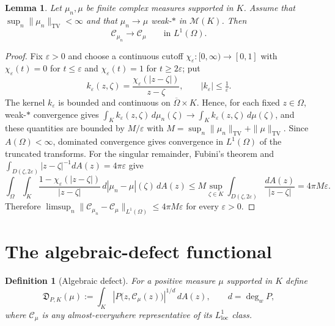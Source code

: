 \documentclass[10pt,a4paper]{amsart}
\newtheorem{lemma}[theorem]{Lemma}
\newtheorem{definition}[theorem]{Definition}
\newcommand{\M}{\mathcal M}
\newcommand{\Cauchy}{\mathcal C}
\newcommand{\TV}{\mathrm{TV}}
\newcommand{\eps}{\varepsilon}
\begin{document}
\begin{lemma}\label{lem:L1-Cauchy-continuity}
Let $\mu_n,\mu$ be finite complex measures supported in $K$.  Assume that
$\sup_n\|\mu_n\|_{\TV}<\infty$ and that $\mu_n\to\mu$ weak-$*$ in $\M(K)$.
Then
\begin{equation}\label{eq:L1-Cauchy-convergence}
 \Cauchy_{\mu_n}\longrightarrow\Cauchy_\mu
 \qquad\text{in }L^1(\Omega).
\end{equation}
\end{lemma}

\begin{proof}
Fix $\eps>0$ and choose a continuous cutoff $\chi_\eps:[0,\infty)\to[0,1]$ with
$\chi_\eps(t)=0$ for $t\leq\eps$ and $\chi_\eps(t)=1$ for $t\geq 2\eps$; put
\[
 k_\eps(z,\zeta)=\frac{\chi_\eps(|z-\zeta|)}{z-\zeta},
 \qquad |k_\eps|\leq\tfrac1\eps .
\]
The kernel $k_\eps$ is bounded and continuous on $\overline\Omega\times K$.
Hence, for each fixed $z\in\Omega$, weak-$*$ convergence gives
$\int_Kk_\eps(z,\zeta)\,d\mu_n(\zeta)\to\int_Kk_\eps(z,\zeta)\,d\mu(\zeta)$, and
these quantities are bounded by $M/\eps$ with
$M=\sup_n\|\mu_n\|_{\TV}+\|\mu\|_{\TV}$.  Since $A(\Omega)<\infty$, dominated
convergence gives convergence in $L^1(\Omega)$ of the truncated transforms.  For
the singular remainder, Fubini's theorem and
$\int_{D(\zeta,2\eps)}|z-\zeta|^{-1}dA(z)=4\pi\eps$ give
\[
 \int_\Omega\int_K
 \frac{1-\chi_\eps(|z-\zeta|)}{|z-\zeta|}\,
 d|\mu_n-\mu|(\zeta)\,dA(z)
 \leq
 M\sup_{\zeta\in K}\int_{D(\zeta,2\eps)}\frac{dA(z)}{|z-\zeta|}
 =4\pi M\eps .
\]
Therefore
$\limsup_n\|\Cauchy_{\mu_n}-\Cauchy_\mu\|_{L^1(\Omega)}\leq 4\pi M\eps$ for
every $\eps>0$.
\end{proof}

\section{The algebraic-defect functional}\label{sec:defect}

\begin{definition}[Algebraic defect]
\label{def:algebraic-defect}
For a positive measure $\mu$ supported in $K$ define
\begin{equation}\label{eq:defect-functional}
 \mathfrak D_{P,K}(\mu)
 :=\int_K
 \left|P\bigl(z,\Cauchy_\mu(z)\bigr)\right|^{1/d}\,dA(z),
 \qquad d=\deg_wP,
\end{equation}
where $\Cauchy_\mu$ is any almost-everywhere representative of its
$L^1_{\mathrm{loc}}$ class.
\end{definition}
\end{document}
